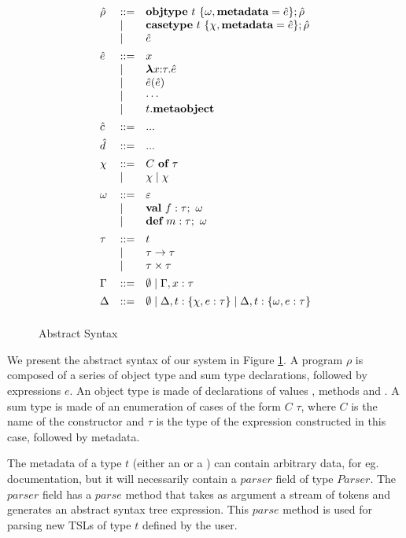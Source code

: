 \begin{figure}
\[\begin{array}[t]{lll}
\hat\rho & \bnfdef & \keyw{objtype}~ t~ \{ \omega, \keyw{metadata}=\hat e \}; \hat\rho \\
     & \bnfalt & \keyw{casetype}~ t~ \{ \chi, \keyw{metadata}=\hat e \}; \hat\rho\\
     & \bnfalt & \hat e
     \\[1ex]
\hat{e}    & \bnfdef & x \\
     & \bnfalt & \boldsymbol\lambda x{:}\tau . \hat{e} \\ %
     & \bnfalt & \hat{e}(\hat{e}) \\
     & \bnfalt & \cdots \\
     & \bnfalt & t.\keyw{metaobject} 
\\[1ex]
\hat c    & \bnfdef & ...
	 \\[1ex]
\hat d   & \bnfdef & ... 
\\[1ex] 
\chi & \bnfdef & C~\keyw{of}~\tau\\
     & \bnfalt & \chi \bnfalt \chi 
\\[1ex]
\omega &\bnfdef & \varepsilon \\  
         & \bnfalt & \keyw{val}~ f:\tau;~\omega\\
         & \bnfalt & \keyw{def}~ m:\tau;~\omega 
\\[1ex]
\tau & \bnfdef & t\\
     & \bnfalt & \tau \rightarrow \tau \\
     & \bnfalt & \tau \times \tau 
\\[1ex]
\Gamma & \bnfdef & \emptyset \bnfalt \Gamma, x:\tau
\\[1ex]
\Delta & \bnfdef & \emptyset \bnfalt \Delta, t:\{\chi, e:\tau\} \bnfalt \Delta, t:\{\omega, e:\tau\}
\\[1ex]

\end{array}
\]
\caption{Abstract Syntax}
\label{fig:core2-syntax}
\end{figure}

We present the abstract syntax of our system in Figure \ref{fig:core2-syntax}. A program $\rho$ is composed of a series of object type  and sum type  declarations, followed by expressions $e$. An object type is made of declarations of values , methods  and . A sum type is made of an enumeration of cases of the form $C$  $\tau$, where $C$ is the name of the constructor and $\tau$ is the type of the expression constructed in this case, followed by metadata.

The metadata of a type $t$ (either an  or a ) can contain arbitrary data, for eg. documentation, but it will necessarily contain a $parser$ field of type $Parser$. The $parser$ field has a $parse$ method that takes as argument a stream of tokens and generates an abstract syntax tree expression. This $parse$ method is used for parsing new TSLs of type $t$ defined by the user. 

